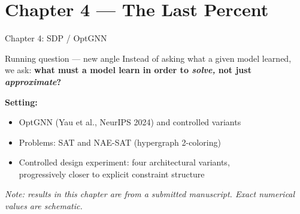 \documentclass[aspectratio=169,10pt,dvipsnames]{beamer}
\begin{document}

\section{Chapter 4 — The Last Percent}

\begin{frame}{Chapter 4: SDP / OptGNN}

\begin{block}{Running question — new angle}
Instead of asking what a given model learned,\\
we ask: \textbf{what must a model learn in order to \textit{solve,} not just \textit{approximate}?}
\end{block}

\bigskip
\textbf{Setting:}
\begin{itemize}
  \item OptGNN (Yau et al., NeurIPS 2024) and controlled variants
  \item Problems: SAT and NAE-SAT (hypergraph 2-coloring)
  \item Controlled design experiment: four architectural variants,\\
        progressively closer to explicit constraint structure
\end{itemize}

\medskip\small\color{bgucolor}
\textit{Note: results in this chapter are from a submitted manuscript. Exact numerical values are schematic.}

\end{frame}
\end{document}

